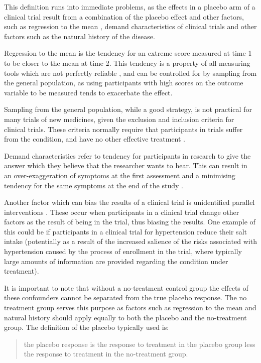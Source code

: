 This definition runs into immediate problems, as the effects in a placebo arm of a clinical trial result from a combination of the placebo effect and other factors, such as regression to the mean \cite{Morton2003}, demand characteristics of clinical trials \cite{Hrobjartsson2001}  and other factors such as the natural history of the disease.   

Regression to the mean is the tendency for an extreme score measured at time 1 to be closer to the mean at time 2. This tendency is a property of all measuring tools which are not perfectly reliable \cite{Morton2003}, and can be controlled for by sampling from the general population, as using participants with high scores on the outcome variable to be measured tends to exacerbate the effect. 

Sampling from the general population, while a good strategy, is not practical for many trials of new medicines, given the exclusion and inclusion criteria for clinical trials. These criteria normally require that participants in trials suffer from the condition, and have no other effective treatment \cite{Daugherty2008}.   

Demand characteristics \cite{Fernandez1994,weber1972subject} refer to tendency for participants in research to give the answer which they believe that the researcher wants to hear. This can result in an over-exaggeration of symptoms at the first assessment and a minimising tendency for the same symptoms at the end of the study \cite{Vase2005}.  

Another factor which can bias the results of a clinical trial is unidentified parallel interventions \cite{Ernst1995b}. These occur when participants in a clinical trial change other factors as the result of being in the trial, thus biasing the results. One example of this could be if participants in a clinical trial for hypertension reduce their salt intake (potentially as a result of the increased salience of the risks associated with hypertension caused by the process of enrollment in the trial, where typically large amounts of information are provided regarding the condition under treatment). 

It is important to note that without a no-treatment control group the effects of these confounders cannot be separated from the true placebo response.  The no treatment group serves this purpose as factors such as regression to the mean and natural history should apply equally to both the placebo and the no-treatment group.  The definition of the placebo typically used is:
\begin{quotation}
 the placebo response is the response to treatment in the placebo group less the response to treatment in the no-treatment group.  
\end{quotation}

